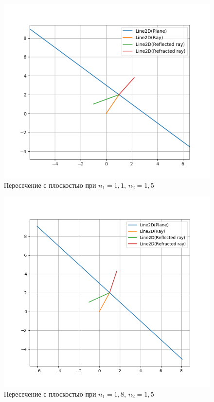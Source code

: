 {	\begin{figure}[H]
		\centering
		\includegraphics[width=0.65\pagewidth]{plane_intersect2}
		\caption{Пересечение с плоскостью при $n_1 = 1,1$, $n_2 = 1,5$}
		\label{plane_intersect2}
	\end{figure}
	
	\begin{figure}[H]
		\centering
		\includegraphics[width=0.65\pagewidth]{plane_intersect3}
		\caption{Пересечение с плоскостью при $n_1 = 1,8$, $n_2 = 1,5$}
		\label{plane_intersect3}
	\end{figure}
}

